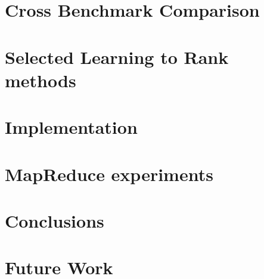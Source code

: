 \chapter{Cross Benchmark Comparison}

\chapter{Selected Learning to Rank methods}

\chapter{Implementation}

\chapter{MapReduce experiments}

\chapter{Conclusions}

\chapter{Future Work}

\cleardoublepage
\appendix








